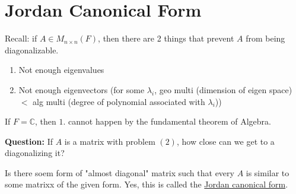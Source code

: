 \documentclass{article}
\newtheorem{one minute paper}[theorem]{One Minute Paper}
\begin{document}
\section*{Jordan Canonical Form}

Recall: if $A \in M_{n \times n}(F)$, then there are 2 things that prevent $A$ from being diagonalizable. 
\begin{enumerate}
    \item Not enough eigenvalues 
    \item Not enough eigenvectors (for some $\lambda_i$, geo multi (dimension of eigen space) $<$ alg multi (degree of polynomial associated with $\lambda_i$))
\end{enumerate}
If $F = \mathbb{C}$, then $1.$ cannot happen by the fundamental theorem of Algebra.
\begin{center}
    \textbf{Question:} If $A$ is a matrix with problem $(2)$, how close can we get to a diagonalizing it? 
\end{center}

Is there soem form of "almost diagonal" matrix such that every $A$ is similar to some matrixx of the given form. Yes, this is called the \underline{Jordan canonical form}. 
\end{document}
